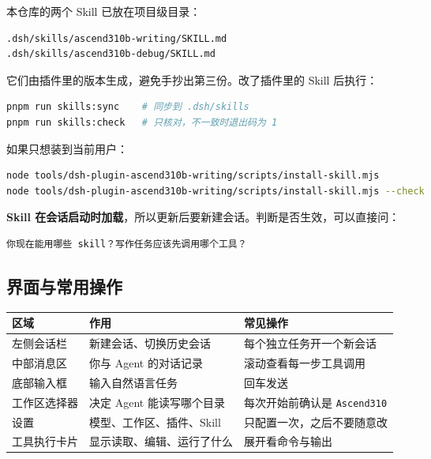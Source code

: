 本仓库的两个 Skill 已放在项目级目录：

\begin{lstlisting}
.dsh/skills/ascend310b-writing/SKILL.md
.dsh/skills/ascend310b-debug/SKILL.md
\end{lstlisting}

它们由插件里的版本生成，避免手抄出第三份。改了插件里的 Skill 后执行：

\begin{lstlisting}[language=bash]
pnpm run skills:sync    # 同步到 .dsh/skills
pnpm run skills:check   # 只核对，不一致时退出码为 1
\end{lstlisting}

如果只想装到当前用户：

\begin{lstlisting}[language=bash]
node tools/dsh-plugin-ascend310b-writing/scripts/install-skill.mjs
node tools/dsh-plugin-ascend310b-writing/scripts/install-skill.mjs --check
\end{lstlisting}

\textbf{Skill
在会话启动时加载}，所以更新后要新建会话。判断是否生效，可以直接问：

\begin{lstlisting}
你现在能用哪些 skill？写作任务应该先调用哪个工具？
\end{lstlisting}

\subsection{界面与常用操作}\label{ux754cux9762ux4e0eux5e38ux7528ux64cdux4f5c}

\begin{longtable}[]{@{}
  >{\raggedright\arraybackslash}p{}
  >{\raggedright\arraybackslash}p{}
  >{\raggedright\arraybackslash}p{}@{}}
\toprule\noalign{}
\begin{minipage}[b]{\linewidth}\raggedright
区域
\end{minipage} & \begin{minipage}[b]{\linewidth}\raggedright
作用
\end{minipage} & \begin{minipage}[b]{\linewidth}\raggedright
常见操作
\end{minipage} \\
\midrule\noalign{}
\endhead
\bottomrule\noalign{}
\endlastfoot
左侧会话栏 & 新建会话、切换历史会话 & 每个独立任务开一个新会话 \\
中部消息区 & 你与 Agent 的对话记录 & 滚动查看每一步工具调用 \\
底部输入框 & 输入自然语言任务 & 回车发送 \\
工作区选择器 & 决定 Agent 能读写哪个目录 & 每次开始前确认是
\passthrough{\lstinline!Ascend310!} \\
设置 & 模型、工作区、插件、Skill & 只配置一次，之后不要随意改 \\
工具执行卡片 & 显示读取、编辑、运行了什么 & 展开看命令与输出 \\
\end{longtable}


